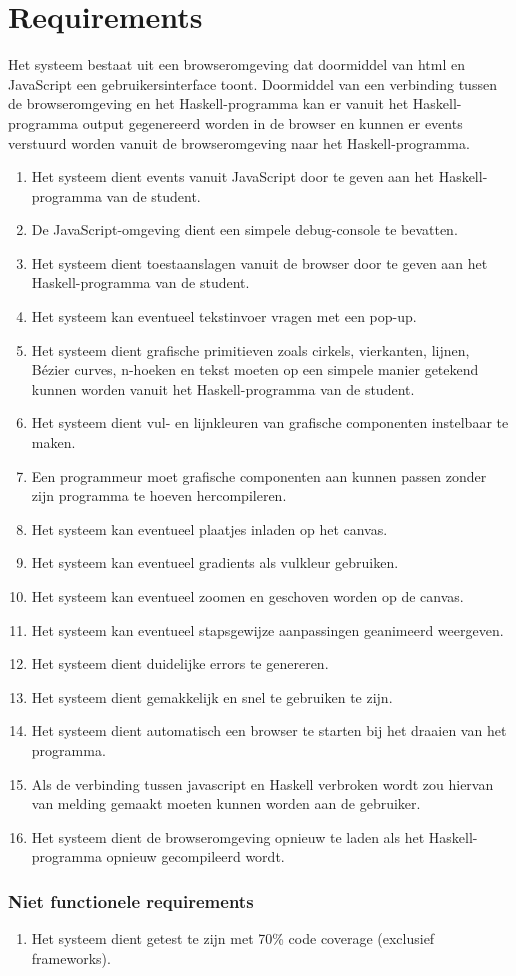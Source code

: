 \section{Requirements}
Het systeem bestaat uit een browseromgeving dat doormiddel van html en JavaScript een gebruikersinterface toont. Doormiddel van een verbinding tussen de browseromgeving en het Haskell-programma kan er vanuit het Haskell-programma output gegenereerd worden in de browser en kunnen er events verstuurd worden vanuit de browseromgeving naar het Haskell-programma.

\begin{enumerate}[{R}1]
	\item Het systeem dient events vanuit JavaScript door te geven aan het Haskell-programma van de student.
	\item De JavaScript-omgeving dient een simpele debug-console te bevatten.
	\item Het systeem dient toestaanslagen vanuit de browser door te geven aan het Haskell-programma van de student.
	\item Het systeem kan eventueel tekstinvoer vragen met een pop-up.
	\item Het systeem dient grafische primitieven zoals cirkels, vierkanten, lijnen, Bézier curves, n-hoeken en tekst moeten op een simpele manier getekend kunnen worden vanuit het Haskell-programma van de student.
	\item Het systeem dient vul- en lijnkleuren van grafische componenten instelbaar te maken.
	\item Een programmeur moet grafische componenten aan kunnen passen zonder zijn programma te hoeven hercompileren.
	\item Het systeem kan eventueel plaatjes inladen op het canvas.
	\item Het systeem kan eventueel gradients als vulkleur gebruiken.
	\item Het systeem kan eventueel zoomen en geschoven worden op de canvas.
	\item Het systeem kan eventueel stapsgewijze aanpassingen geanimeerd weergeven.
	\item Het systeem dient duidelijke errors te genereren.
	\item Het systeem dient gemakkelijk en snel te gebruiken te zijn.
	\item Het systeem dient automatisch een browser te starten bij het draaien van het programma.
		\item Als de verbinding tussen javascript en Haskell verbroken wordt zou hiervan van melding gemaakt moeten kunnen worden aan de gebruiker. 
	\item Het systeem dient de browseromgeving opnieuw te laden als het Haskell-programma opnieuw gecompileerd wordt.

\end{enumerate}
\subsubsection{Niet functionele requirements}
\begin{enumerate}[{R}17]
	\item Het systeem dient getest te zijn met 70\% code coverage (exclusief frameworks).
\end{enumerate}